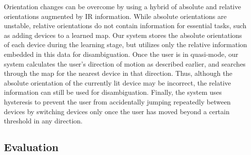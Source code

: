 Orientation changes can be overcome by using a hybrid of absolute and relative orientations augmented by IR information. While absolute orientations are unstable, relative orientations do not contain information for essential tasks, such as adding devices to a learned map. Our system stores the absolute orientations of each device during the learning stage, but utilizes only the relative information embedded in this data for disambiguation. Once the user is in quasi-mode, our system calculates the user's direction of motion as described earlier, and searches through the map for the nearest device in that direction. Thus, although the absolute orientation of the currently lit device may be incorrect, the relative information can still be used for disambiguation. Finally, the system uses hysteresis to prevent the user from accidentally jumping repeatedly between devices by switching devices only once the user has moved beyond a certain threshold in any direction. 



\subsection{Evaluation}




